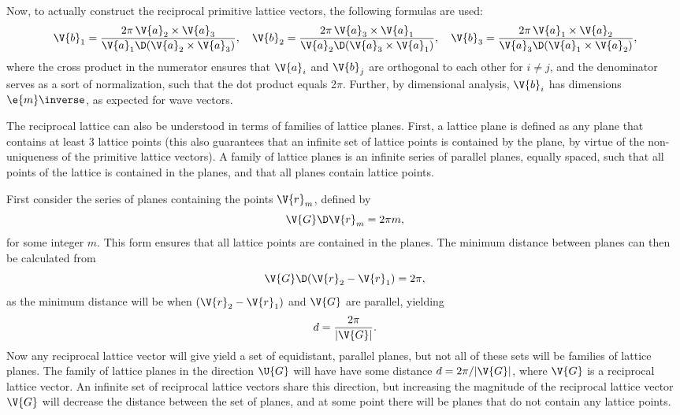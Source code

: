 \documentclass[main.tex]{subfiles}
\begin{document}
	Now, to actually construct the reciprocal primitive lattice vectors, the following formulas are used:
	\begin{equation}\label{eq:rec_prim_vec}
		\V{b}_1 = \frac{2\pi \, \V{a}_2 \times \V{a}_3}{\V{a}_1 \D (\V{a}_2 \times \V{a}_3)}, \quad \V{b}_2 = \frac{2\pi \, \V{a}_3 \times \V{a}_1}{\V{a}_2 \D (\V{a}_3 \times \V{a}_1)}, \quad \V{b}_3 = \frac{2\pi \, \V{a}_1 \times \V{a}_2}{\V{a}_3 \D (\V{a}_1 \times \V{a}_2)},
	\end{equation}
	where the cross product in the numerator ensures that $ \V{a}_i $ and $ \V{b}_j $ are orthogonal to each other for $ i \neq j $, and the denominator serves as a sort of normalization, such that the dot product equals 2$ \pi $. Further, by dimensional analysis, $ \V{b}_i $ has dimensions $ \e{m}\inverse $, as expected for wave vectors.
	
	The reciprocal lattice can also be understood in terms of families of lattice planes. First, a lattice plane is defined as any plane that contains at least 3 lattice points (this also guarantees that an infinite set of lattice points is contained by the plane, by virtue of the non-uniqueness of the primitive lattice vectors). A family of lattice planes is an infinite series of parallel planes, equally spaced, such that all points of the lattice is contained in the planes, and that all planes contain lattice points.
	
	First consider the series of planes containing the points $ \V{r}_m $, defined by
	\begin{equation}
		\V{G} \D \V{r}_m = 2\pi m,
	\end{equation}
	for some integer $ m $. This form ensures that all lattice points are contained in the planes. The minimum distance between planes can then be calculated from
	\begin{equation}
		\V{G} \D (\V{r}_2 - \V{r}_1) = 2\pi,
	\end{equation}
	as the minimum distance will be when $ (\V{r}_2-\V{r}_1) $ and $ \V{G} $ are parallel, yielding
	\begin{equation}
		d = \frac{2\pi}{|\V{G}|}.
	\end{equation}
	Now any reciprocal lattice vector will give yield a set of equidistant, parallel planes, but not all of these sets will be families of lattice planes. The family of lattice planes in the direction $ \U{G} $ will have have some distance $ d = 2\pi /|\V{G}| $, where $ \V{G} $ is a reciprocal lattice vector. An infinite set of reciprocal lattice vectors share this direction, but increasing the magnitude of the reciprocal lattice vector $ \V{G} $ will decrease the distance between the set of planes, and at some point there will be planes that do not contain any lattice points.
	
\end{document}
